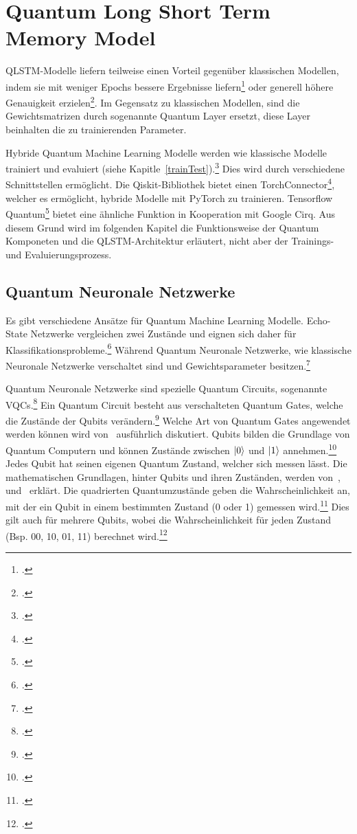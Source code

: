 \section{Quantum Long Short Term Memory Model}

\ac{QLSTM}-Modelle liefern teilweise einen Vorteil gegenüber klassischen Modellen, indem sie mit weniger Epochs bessere Ergebnisse liefern\footcite[Vgl.][]{Chen2022} oder generell höhere Genauigkeit erzielen\footcite[Vgl.][]{Yu2023}.
Im Gegensatz zu klassischen Modellen, sind die Gewichtsmatrizen durch sogenannte Quantum Layer ersetzt, diese Layer beinhalten die zu trainierenden Parameter.

Hybride Quantum Machine Learning Modelle werden wie klassische Modelle trainiert und evaluiert (siehe Kapitle~\ref{trainTest}).\footcite[Vgl. ][S. 414]{Kwak2021} Dies wird durch verschiedene Schnittstellen ermöglicht. 
Die Qiskit-Bibliothek bietet einen TorchConnector\footcite[][]{Qiskita}, welcher es ermöglicht, hybride Modelle mit PyTorch zu trainieren. Tensorflow Quantum\footcite[][]{TFa} bietet eine ähnliche Funktion in Kooperation mit Google Cirq.
Aus diesem Grund wird im folgenden Kapitel die Funktionsweise der Quantum Komponeten und die \ac{QLSTM}-Architektur erläutert, nicht aber der Trainings- und Evaluierungsprozess.


\subsection{Quantum Neuronale Netzwerke}\label{qnn}
Es gibt verschiedene Ansätze für Quantum Machine Learning Modelle. Echo-State Netzwerke vergleichen zwei Zustände und eignen sich daher für Klassifikationsprobleme.\footcite[Vgl.][S. 2]{Mitarai2018}
Während Quantum Neuronale Netzwerke, wie klassische Neuronale Netzwerke verschaltet sind und Gewichtsparameter besitzen.\footcite[Vgl.][S. 2]{Monaco2023}

Quantum Neuronale Netzwerke sind spezielle Quantum Circuits, sogenannte \ac{VQC}s.\footcite[Vgl.][S. 413]{Kwak2021}
Ein Quantum Circuit besteht aus verschalteten Quantum Gates, welche die Zustände der Qubits verändern.\footcite[Vgl.][s. 51]{Williams1998}
Welche Art von Quantum Gates angewendet werden können wird von~\cite[][S. 51ff.]{Williams1998} ausführlich diskutiert.
Qubits bilden die Grundlage von Quantum Computern und können Zustände zwischen $\ket{0}$ und $\ket{1}$ annehmen.\footcite[Vgl.][S. 413]{Kwak2021}
Jedes Qubit hat seinen eigenen Quantum Zustand, welcher sich messen lässt.
Die mathematischen Grundlagen, hinter Qubits und ihren Zuständen, werden von~\cite[][S. 8ff.]{Williams1998},~\cite[][S. 413]{Kwak2021} und~\cite[][S. 97]{Weigold2021} erklärt. Die quadrierten Quantumzustände geben die Wahrscheinlichkeit an, mit der ein Qubit in einem bestimmten Zustand (0 oder 1) gemessen wird.\footcite[Vgl.][S. 96]{Weigold2021} Dies gilt auch für mehrere Qubits, wobei die Wahrscheinlichkeit für jeden Zustand (Bsp. 00, 10, 01, 11) berechnet wird.\footcite[Vgl.][S. 8]{Chen2022}

